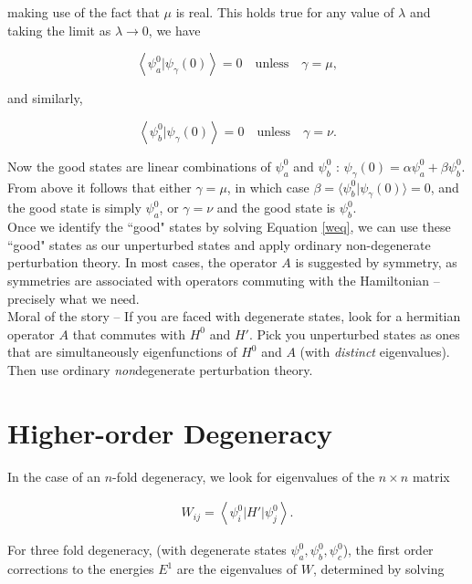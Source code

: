 \documentclass[svgnames]{article}     %
\begin{document}
making use of the fact that $\mu$ is real. This holds true for any value of
$\lambda$ and taking the limit as $\lambda \rightarrow 0$, we have 

\[
\left\langle \psi_a^{0} | \psi_\gamma(0) \right\rangle = 0 \quad \text{unless}
\quad \gamma = \mu,
\] \vspace{3px}

\noindent 
and similarly, 

\[
\left\langle \psi_b^{0} | \psi_\gamma (0) \right\rangle = 0 \quad \text{unless} \quad
  \gamma = \nu.
\] \vspace{3px}

Now the good states are linear combinations of $\psi_a^{0}$ and $\psi_b^{0}$
: $\psi_\gamma(0) = \alpha \psi_a^{0} + \beta \psi_b^{0}$. From above it follows
that either $\gamma = \mu$, in which case $\beta = \langle \psi_b^{0}
| \psi_\gamma(0) \rangle = 0$, and the  good state is simply $\psi_a^{0}$, or
$\gamma = \nu$ and the good state is $\psi_b^{0}$. 
\\

Once we identify the ``good" states by solving Equation \ref{weq},  we can use
these ``good" states as our unperturbed states and apply ordinary
non-degenerate perturbation theory. In most cases, the operator $A$ is
suggested by symmetry, as symmetries are associated with operators commuting
with the Hamiltonian -- precisely what we need. \\ 



Moral of the story -- If you are faced with degenerate states, look for
a hermitian operator $A$ that commutes with $H^{0}$ and $H'$. Pick you
unperturbed states as ones that are simultaneously eigenfunctions of $H^{0}$
and $A$ (with \textit{distinct} eigenvalues). Then use ordinary
\textit{non}degenerate perturbation theory. 

\section{Higher-order Degeneracy}

In the case of an $n$-fold degeneracy, we look for eigenvalues of the $n \times
n$ matrix 

\begin{align} \label{}
  W_{ij} = \left\langle \psi_i^{0} | H' | \psi_j^{0}\right\rangle.
\end{align}\vspace{3px}


For three fold degeneracy, (with degenerate states $\psi_a^{0}, \psi_b^{0},
\psi_c^{0}$), the first order corrections to the energies $E^{1}$ are the
eigenvalues of $W$, determined by solving 
\end{document}
